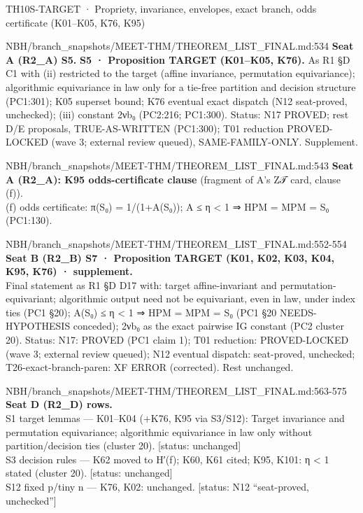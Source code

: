\begin{card}{TH10}{S-TARGET · Propriety, invariance, envelopes, exact branch, odds certificate (K01–K05, K76, K95)}
\begin{stmt}{NBH/branch_snapshots/MEET-THM/THEOREM_LIST_FINAL.md:534}
\textbf{Seat A (R2\_A) S5.} \textbf{S5 · Proposition TARGET (K01–K05, K76).} As R1 §D C1 with (ii) restricted to the target (affine invariance, permutation equivariance); algorithmic equivariance in law only for a tie-free partition and decision structure (PC1:301); K05 superset bound; K76 eventual exact dispatch (N12 seat-proved, unchecked); (iii) constant 2νb₀ (PC2:216; PC1:300). Status: N17 PROVED; rest D/E proposals, TRUE-AS-WRITTEN (PC1:300); T01 reduction PROVED-LOCKED (wave 3; external review queued), SAME-FAMILY-ONLY. Supplement.
\end{stmt}

\begin{stmt}{NBH/branch_snapshots/MEET-THM/THEOREM_LIST_FINAL.md:543}
\textbf{Seat A (R2\_A): K95 odds-certificate clause} (fragment of A's Z𝒯 card, clause (f)).\\
(f) odds certificate: π(S₀) = 1/(1+A(S₀)); A ≤ η < 1 ⇒ HPM = MPM = S₀ (PC1:130).
\end{stmt}

\begin{stmt}{NBH/branch_snapshots/MEET-THM/THEOREM_LIST_FINAL.md:552-554}
\textbf{Seat B (R2\_B) S7 · Proposition TARGET (K01, K02, K03, K04, K95, K76) · supplement.}\\
Final statement as R1 §D D17 with: target affine-invariant and permutation-equivariant; algorithmic output need not be equivariant, even in law, under index ties (PC1 §20); A(S₀) ≤ η < 1 ⇒ HPM = MPM = S₀ (PC1 §20 NEEDS-HYPOTHESIS conceded); 2νb₀ as the exact pairwise IG constant (PC2 cluster 20). Status: N17: PROVED (PC1 claim 1); T01 reduction: PROVED-LOCKED (wave 3; external review queued); N12 eventual dispatch: seat-proved, unchecked; T26-exact-branch-paren: XF ERROR (corrected). Rest unchanged.
\end{stmt}

\begin{stmt}{NBH/branch_snapshots/MEET-THM/THEOREM_LIST_FINAL.md:563-575}
\textbf{Seat D (R2\_D) rows.}\\
S1 target lemmas — K01–K04 (+K76, K95 via S3/S12): Target invariance and permutation equivariance; algorithmic equivariance in law only without partition/decision ties (cluster 20). [status: unchanged]\\
S3 decision rules — K62 moved to H′(f); K60, K61 cited; K95, K101: η < 1 stated (cluster 20). [status: unchanged]\\
S12 fixed p/tiny n — K76, K02: unchanged. [status: N12 ``seat-proved, unchecked'']
\end{stmt}


\end{card}
